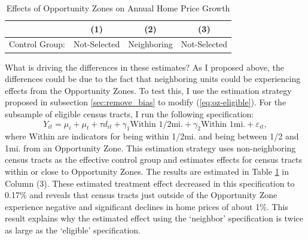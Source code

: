 \begin{table}[!tb]
  \caption{Effects of Opportunity Zones on Annual Home Price Growth}
  \label{tab:oz}
  \renewcommand{\arraystretch}{1.1}

  \begin{center}
  \begin{tabular}{@{} l ccc @{}}
    \toprule
    & (1) & (2) & (3) \\

    \midrule
    
    \midrule
    Control Group: & Not-Selected & Neighboring & Not-Selected \\ 

    \bottomrule
  \end{tabular}

  \end{center}
\end{table}

What is driving the differences in these estimates? As I proposed above, the differences could be due to the fact that neighboring units could be experiencing effects from the Opportunity Zones. To test this, I use the estimation strategy proposed in subsection \ref{sec:remove_bias} to modify (\ref{eq:oz-eligible}). For the subsample of eligible census tracts, I run the following specification: 
\begin{equation}\label{eq:oz-spill}
  Y_{it} = \mu_i + \mu_t + \tau d_{it} + \gamma_{1} \text{Within 1/2mi.} +  \gamma_{2} \text{Within 1mi.} + \varepsilon_{it},
\end{equation}
where $\text{Within}$ are indicators for being within 1/2mi. and being between 1/2 and 1mi. from an Opportunity Zone. This estimation strategy uses non-neighboring census tracts as the effective control group and estimates effects for census tracts within or close to Opportunity Zones. The results are estimated in Table \ref{tab:oz} in Column (3). These estimated treatment effect decreased in this specification to 0.17\% and reveals that census tracts just outside of the Opportunity Zone experience negative and significant declines in home prices of about 1\%. This result explains why the estimated effect using the `neighbor' specification is twice as large as the `eligible' specification. 



